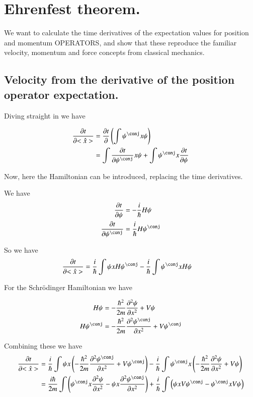 \documentclass{article}
\newcommand{\PDSq}[2]{\frac{\partial^2 {#2}}{\partial {#1}^2}}
\begin{document}
\section{ Ehrenfest theorem. }

We want to calculate the time derivatives of the expectation values
for position and momentum OPERATORS, and show that these reproduce the
familiar velocity, momentum and force concepts from classical mechanics.

\subsection{ Velocity from the derivative of the position operator expectation. }

Diving straight in we have

\begin{align*}
\PD{t}{<\hat{x}>}
&= \PD{t}{} \left( \int \psi^\conj x \psi \right) \\
&= \int \PD{t}{\psi^\conj} x \psi + \int \psi^\conj x \PD{t}{\psi} 
\end{align*}

Now, here the Hamiltonian can be introduced, replacing the time derivatives.

We have
\begin{align*}
\PD{t}{\psi} &= -\frac{i}{\hbar} H \psi \\
\PD{t}{\psi^\conj} &= \frac{i}{\hbar} H \psi^\conj \\
\end{align*}

So we have
\begin{align*}
\PD{t}{<\hat{x}>}
&= \frac{i}{\hbar} \int \psi x H {\psi^\conj} - \frac{i}{\hbar}\int \psi^\conj x H {\psi} 
\end{align*}

For the Schr\"{o}dinger Hamiltonian we have

\begin{align*}
H \psi &= - \frac{\hbar^2}{2m} \PDSq{x}{\psi} + V\psi \\
H \psi^\conj &= - \frac{\hbar^2}{2m} \PDSq{x}{\psi^\conj} + V\psi^\conj \\
\end{align*}

Combining these we have
\begin{align*}
\PD{t}{<\hat{x}>}
&= 
\frac{i}{\hbar} \int \psi x \left( - \frac{\hbar^2}{2m} \PDSq{x}{\psi^\conj} + V\psi^\conj \right) 
-\frac{i}{\hbar} \int \psi^\conj x \left(- \frac{\hbar^2}{2m} \PDSq{x}{\psi} + V\psi \right) \\
&= 
\frac{i\hbar}{2m} \int \left(\psi^\conj x \PDSq{x}{\psi} -\psi x \PDSq{x}{\psi^\conj} \right)
+\frac{i}{\hbar} \int \left(\psi x V\psi^\conj -\psi^\conj x V\psi \right) 
\\
\end{align*}
\end{document}
